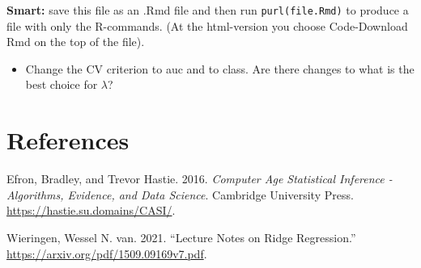 \documentclass[
  letterpaper,
  DIV=11,
  numbers=noendperiod]{scrartcl}
\providecommand{\tightlist}{%
  \setlength{\itemsep}{0pt}\setlength{\parskip}{0pt}}\usepackage{longtable,booktabs,array}
\newlength{\cslhangindent}
\newlength{\cslentryspacingunit} %
\newenvironment{CSLReferences}[2] %
 {%
  \setlength{\parindent}{0pt}
  \ifodd #1
  \let\oldpar\par
  \def\par{\hangindent=\cslhangindent\oldpar}
  \fi
  \setlength{\parskip}{#2\cslentryspacingunit}
 }%
 {}
\begin{document}
\textbf{Smart:} save this file as an .Rmd file and then run
\texttt{purl(file.Rmd)} to produce a file with only the R-commands. (At
the html-version you choose Code-Download Rmd on the top of the file).

\begin{itemize}
\tightlist
\item
  Change the CV criterion to auc and to class. Are there changes to what
  is the best choice for \(\lambda\)?
\end{itemize}

\hypertarget{references}{%
\section{References}\label{references}}

\hypertarget{refs}{}
\begin{CSLReferences}{1}{0}
\leavevmode{}%
Efron, Bradley, and Trevor Hastie. 2016. \emph{Computer Age Statistical
Inference - Algorithms, Evidence, and Data Science}. Cambridge
University Press. \url{https://hastie.su.domains/CASI/}.

\leavevmode{}%
Wieringen, Wessel N. van. 2021. {``Lecture Notes on Ridge Regression.''}
\url{https://arxiv.org/pdf/1509.09169v7.pdf}.

\end{CSLReferences}
\end{document}

